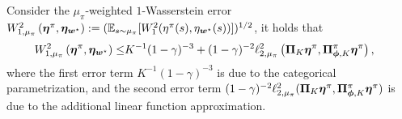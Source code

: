 \begin{proposition}
\label{prop:approx_error}
Consider the $\mu_\pi$-weighted $1$-Wasserstein error $W_{1,\mu_{\pi}}^2\left({\bm{\eta}^\pi,\bm{\eta}_{{\bm{w}}^{\star}}}\right):=({\mathbb E}_{s\sim\mu_{\pi}}[W_1^2({\eta}^\pi(s),{\eta}_{{\bm{w}}^{\star}}(s))])^{1/2}$, it holds that
   \begin{equation*}
    \begin{aligned}
        W_{1,\mu_{\pi}}^2\left({\bm{\eta}^\pi,\bm{\eta}_{{\bm{w}}^{\star}}}\right)\leq& K^{-1}(1-\gamma)^{-3}+(1-\gamma)^{-2}\ell_{2,\mu_{\pi}}^2\left({{\bm{\Pi}}_K\bm{\eta}^{\pi},{\bm{\Pi}}_{{\bm{\phi}}, K}^{\pi}\bm{\eta}^{\pi}}\right),
    \end{aligned}
\end{equation*}
where the first error term $K^{-1}(1-\gamma)^{-3}$ is due to the categorical parametrization, and the second error term $(1-\gamma)^{-2}\ell_{2,\mu_{\pi}}^2({\bm{\Pi}}_K\bm{\eta}^{\pi},{\bm{\Pi}}_{{\bm{\phi}}, K}^{\pi}\bm{\eta}^{\pi})$ is due to the additional linear function approximation. 
\end{proposition}
